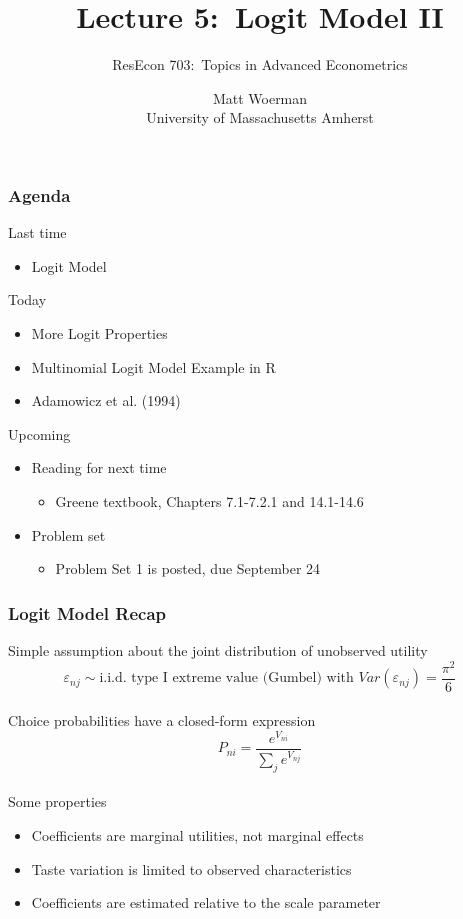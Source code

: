 \documentclass{beamer}\usepackage[]{graphicx}\usepackage[]{color}
\title[Lecture 5:\ Logit Model II]{Lecture 5:\ Logit Model II}
\author[ResEcon 703:\ Advanced Econometrics]{ResEcon 703:\ Topics in Advanced Econometrics}
\date{Matt Woerman\\University of Massachusetts Amherst}
\begin{document}
{ 
\begin{frame}[noframenumbering]
    \titlepage
\end{frame}
}

\begin{frame}\frametitle{Agenda}
    Last time
    \begin{itemize}
        \item Logit Model
    \end{itemize}
    \vspace{2ex}
    Today
    \begin{itemize}
    	\item More Logit Properties
    	\item Multinomial Logit Model Example in R
    	\item Adamowicz et al. (1994)
    \end{itemize}
    \vspace{2ex}
    Upcoming
    \begin{itemize}
        \item Reading for next time
        \begin{itemize}
            \item Greene textbook, Chapters 7.1-7.2.1 and 14.1-14.6
        \end{itemize}
        \item Problem set
        \begin{itemize}
            \item Problem Set 1 is posted, due September 24
        \end{itemize}
    \end{itemize}
\end{frame}

\begin{frame}\frametitle{Logit Model Recap}
	Simple assumption about the joint distribution of unobserved utility
	$$\varepsilon_{nj} \sim \text{i.i.d.\ type I extreme value (Gumbel) with } Var(\varepsilon_{nj}) = \frac{\pi^2}{6}$$ \\
	\vspace{2ex}
	Choice probabilities have a closed-form expression
	$$P_{ni} = \frac{e^{V_{ni}}}{\sum_j e^{V_{nj}}}$$ \\
	\vspace{2ex}
	Some properties
	\begin{itemize}
		\item Coefficients are marginal utilities, not marginal effects
		\item Taste variation is limited to observed characteristics
		\item Coefficients are estimated relative to the scale parameter
	\end{itemize}
\end{frame}
\end{document}

